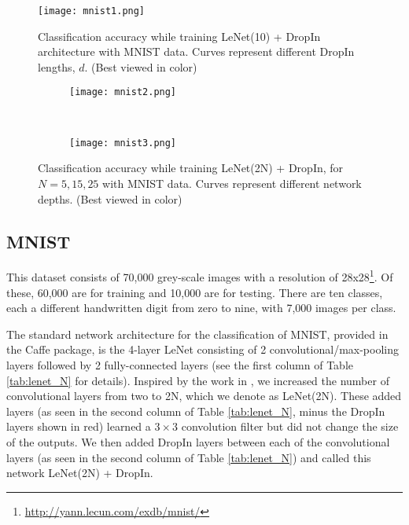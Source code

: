 \documentclass[10pt,twocolumn,letterpaper]{article}
\newcommand{\dropin}{DropIn }
\newcommand{\dropinNS}{DropIn}
\begin{document}
\begin{figure}[tbh]
\begin{center}
   \texttt{[image: mnist1.png]}
\end{center}
  \vspace{-10pt}
   \caption{Classification accuracy while training LeNet(10) + \dropin architecture with MNIST data. Curves represent different \dropin lengths, $d$.  (Best viewed in color)  
}
\label{fig:lenet_10}
  \vspace{-10pt}
\end{figure}

\begin{figure}[tbh]
\begin{center}
\begin{subfigure}[b]{0.5\textwidth}
        \texttt{[image: mnist2.png]}
    \end{subfigure}\\
    \begin{subfigure}[b]{0.5\textwidth}
        \texttt{[image: mnist3.png]}
    \end{subfigure}
\end{center}
 \vspace{-10pt}
   \caption{Classification accuracy while training LeNet(2N) + \dropinNS, for $N=5,15,25$ with MNIST data. Curves represent different network depths. (Best viewed in color)  
}
\label{fig:lenet_droplens}
  \vspace{-10pt}
\end{figure}



\subsection{MNIST} \label{sec:mnist}
This dataset consists of 70,000 grey-scale images with a resolution of 28x28\footnote{\url{http://yann.lecun.com/exdb/mnist/}}.  
Of these, 60,000 are for training and 10,000 are for testing.  
There are ten classes, each a different handwritten digit from zero to nine, with 7,000 images per class.  

The standard network architecture for the classification of MNIST, provided in the Caffe package, is the 4-layer LeNet consisting of 2 convolutional/max-pooling layers followed by 2 fully-connected layers (see the first column of Table \ref{tab:lenet_N} for details).  
Inspired by the work in \cite{srivastava2015training}, we increased the number of convolutional layers from two to 2N, which we denote as LeNet(2N).  
These added layers (as seen in the second column of Table \ref{tab:lenet_N}, minus the \dropin layers shown in red) learned a $3\times 3$ convolution filter but did not change the size of the outputs.  
We then added \dropin layers between each of the convolutional layers (as seen in the second column of Table \ref{tab:lenet_N}) and called this network LeNet(2N) + \dropinNS.
\end{document}
